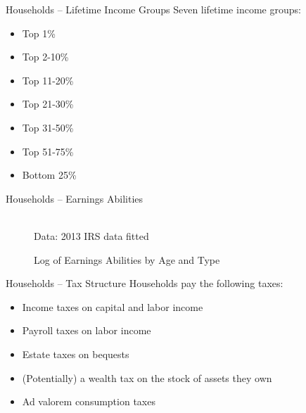 \documentclass{beamer}
\begin{document}
  \begin{frame}{Households -- Lifetime Income Groups}
      Seven lifetime income groups:
      \begin{itemize}
      \item Top 1\%
      \item Top 2-10\%
      \item Top 11-20\%
      \item Top 21-30\%
      \item Top 31-50\%
      \item Top 51-75\%
      \item Bottom 25\%
      \end{itemize}
  \end{frame}

  \begin{frame}{Households -- Earnings Abilities}
      \begin{figure}[htb]\centering
         \caption{Log of Earnings Abilities by Age and Type}
          \\
         \tiny{Data: 2013 IRS data fitted}
      \end{figure}
  \end{frame}

  \begin{frame}{Households -- Tax Structure}
    Households pay the following taxes:
    \begin{itemize}
    \item Income taxes on capital and labor income
    \item Payroll taxes on labor income
    \item Estate taxes on bequests
    \item (Potentially) a wealth tax on the stock of assets they own
    \item Ad valorem consumption taxes
    \end{itemize}
  \end{frame}
\end{document}
